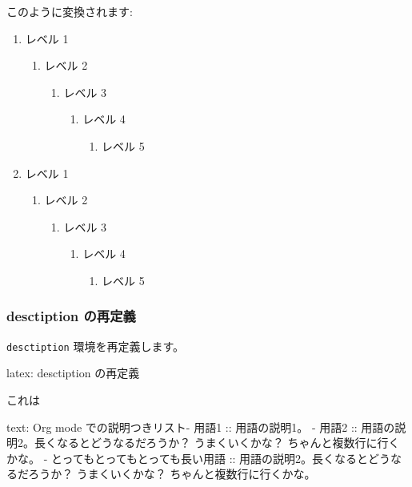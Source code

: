 \documentclass[dvipdfmx,a4j,14pt,uplatex]{jsarticle}
\begin{document}
このように変換されます:


\begin{enumerate}
\item レベル 1
\begin{enumerate}
\item レベル 2
\begin{enumerate}
\item レベル 3
\begin{enumerate}
\item レベル 4
\begin{enumerate}
\item レベル 5
\end{enumerate}
\end{enumerate}
\end{enumerate}
\end{enumerate}
\item レベル 1
\begin{enumerate}
\item レベル 2
\begin{enumerate}
\item レベル 3
\begin{enumerate}
\item レベル 4
\begin{enumerate}
\item レベル 5
\end{enumerate}
\end{enumerate}
\end{enumerate}
\end{enumerate}
\end{enumerate}

\subsubsection{desctiption の再定義}
\label{sec:orga04d309}
\texttt{desctiption} 環境を再定義します。

\begin{programlist}[label={orga533277}]{latex}{: desctiption の再定義}
\end{programlist}
これは

\begin{programlist}[label={orge69d682}]{text}{: Org mode での説明つきリスト}- 用語1 :: 用語の説明1。
- 用語2 :: 用語の説明2。長くなるとどうなるだろうか？ うまくいくかな？
         ちゃんと複数行に行くかな。
- とってもとってもとっても長い用語 :: 
     用語の説明2。長くなるとどうなるだろうか？ うまくいくかな？
     ちゃんと複数行に行くかな。
\end{programlist}
\end{document}
